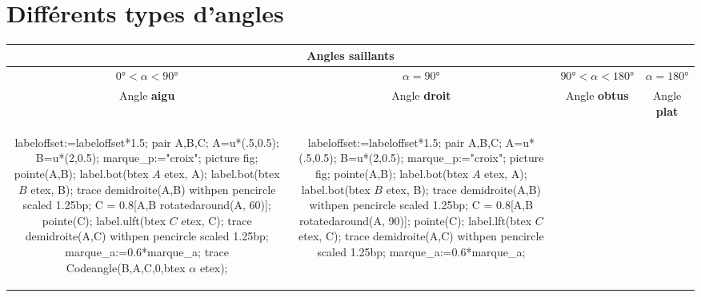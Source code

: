 \section{Différents types d'angles}

\begin{changemargin}{0mm}{-20mm}
\begin{definition}[Classement des angles selon leur mesure $\alpha=\widehat{BAC}$]
    \begin{center}
        {\renewcommand{\arraystretch}{1.5}
        \begin{tabular}{|*4{c|}}
            \hline
            \multicolumn{4}{|c|}{Angles {\bfseries saillants}}\\\hline
            $\ang{0}<\alpha<\ang{90}$ & $\alpha=\ang{90}$ & $\ang{90}<\alpha<\ang{180}$ & $\alpha=\ang{180}$ \\\hline
            Angle \textbf{aigu} & Angle \textbf{droit} &  Angle \textbf{obtus} & Angle \textbf{plat} \\\hline
            \begin{Geometrie}[CoinHD={(2.5u,2u)}]            
                labeloffset:=labeloffset*1.5;
                pair A,B,C;
                A=u*(.5,0.5);
                B=u*(2,0.5);
                marque_p:="croix";
                picture fig;
                pointe(A,B);
                label.bot(btex $A$ etex, A);
                label.bot(btex $B$ etex, B);
                trace demidroite(A,B) withpen pencircle scaled 1.25bp;
                C = 0.8[A,B rotatedaround(A, 60)];
                pointe(C);
                label.ulft(btex $C$ etex, C);
                trace demidroite(A,C) withpen pencircle scaled 1.25bp;
                marque_a:=0.6*marque_a;
                trace Codeangle(B,A,C,0,btex $\alpha$ etex);
            \end{Geometrie}
            &
            \begin{Geometrie}[CoinHD={(2.5u,2u)}]            
                labeloffset:=labeloffset*1.5;
                pair A,B,C;
                A=u*(.5,0.5);
                B=u*(2,0.5);
                marque_p:="croix";
                picture fig;
                pointe(A,B);
                label.bot(btex $A$ etex, A);
                label.bot(btex $B$ etex, B);
                trace demidroite(A,B) withpen pencircle scaled 1.25bp;
                C = 0.8[A,B rotatedaround(A, 90)];
                pointe(C);
                label.lft(btex $C$ etex, C);
                trace demidroite(A,C) withpen pencircle scaled 1.25bp;
                marque_a:=0.6*marque_a;

\end{Geometrie}
\end{tabular}}
\end{center}
\end{definition}
\end{changemargin}
